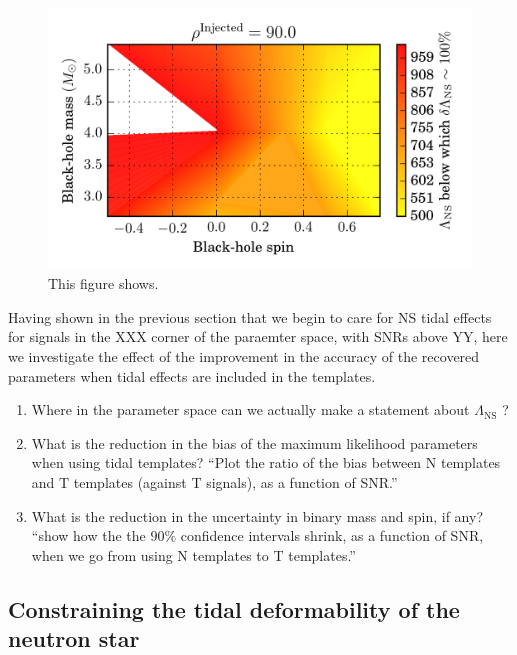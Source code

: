 \documentclass[aps,prd,amsmath,floats,floatfix, twocolumn,
superscriptaddress,nofootinbib,showpacs]{revtex4-1}
\begin{document}
\begin{figure}
\includegraphics[width=.65\columnwidth]{plots-TT/TT_LambdaThresholdForLambdaMeasurement_BHspin_BHmass_SNR90_0_CI90_0.png}
\caption{This figure shows.}
\label{fig:TT_LambdaThresholdForLambdaMeasurement_BHspin_BHmass}
\end{figure}

Having shown in the previous section that we begin to care for NS tidal effects
for signals in the XXX corner of the paraemter space, with SNRs above YY, here
we investigate the effect of the improvement in the accuracy of the recovered
parameters when tidal effects are included in the templates.

\begin{enumerate}
\item Where in the parameter space can we actually make a statement about 
$\Lambda_\mathrm{NS}$ ?
\item What is the reduction in the bias of the maximum likelihood parameters
when using tidal templates?\newline
``Plot the ratio of the bias between N templates and T templates (against T
signals), as a function of SNR.''
\item What is the reduction in the uncertainty in binary mass and spin, if
any?\newline
``show how the the $90\%$ confidence intervals shrink, as a function of SNR, 
when we go from using N templates to T templates.''
\end{enumerate}


\subsection{Constraining the tidal deformability of the neutron star}\label{s2:measuring_lambda}
\end{document}
